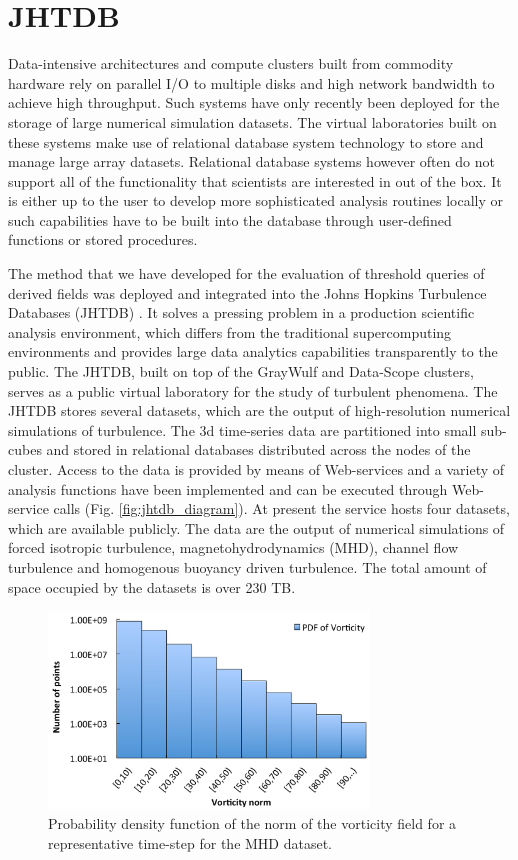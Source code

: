 \documentclass{sig-alternate}
\begin{document}

\section{JHTDB}\label{jhtdb}
Data-intensive architectures and compute clusters built from commodity hardware rely on parallel I/O to multiple disks and high network bandwidth
to achieve high throughput. Such systems have only recently been deployed for the storage of large numerical simulation 
datasets. The virtual laboratories built on these systems make use of relational database system technology to store and manage large array datasets.
Relational database systems however often do not support
all of the functionality that scientists are interested in out of the box. It is either up to the user to develop more sophisticated analysis routines locally or such
capabilities have to be built into the database through user-defined functions or stored procedures. 

The method that we have developed for the evaluation of threshold queries of derived fields was deployed and integrated into the 
Johns Hopkins Turbulence Databases (JHTDB) \cite{Yi, Perlman}. It solves a pressing problem in a production scientific analysis environment, which differs 
from the traditional supercomputing environments and provides large data analytics capabilities transparently to the public. 
The JHTDB, built on top of the GrayWulf and Data-Scope clusters, serves as a public virtual laboratory for
the study of turbulent phenomena. The JHTDB stores several datasets, which are the output of high-resolution numerical simulations of turbulence.
The 3d time-series data are partitioned into small sub-cubes and stored in relational databases distributed across the nodes of the cluster.
Access to the data is provided by means of Web-services and a variety of analysis functions have been
implemented and can be executed through Web-service calls (Fig. \ref{fig:jhtdb_diagram}).
At present the service hosts four datasets, which are available publicly. 
The data are the output of numerical simulations of forced isotropic turbulence, magnetohydrodynamics (MHD), channel 
flow turbulence and homogenous buoyancy driven turbulence.
The total amount of space occupied by the datasets is over 230 TB. 

\begin{figure}
\centering
\includegraphics[width=3.35in]{Figures/pdf.pdf}
\caption{Probability density function of the norm of the vorticity field for a representative time-step for the MHD dataset.}
\label{fig:pdf}
\end{figure}
\end{document}
